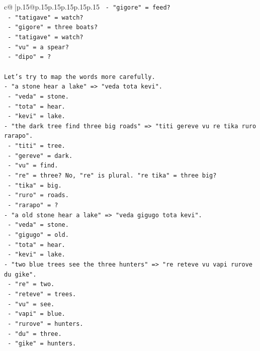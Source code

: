 \documentclass{article}
\begin{document}
{\begin{supertabular}{c@{$\;$}|p{.15\linewidth}@{}p{.15\linewidth}p{.15\linewidth}p{.15\linewidth}p{.15\linewidth}p{.15\linewidth}}
{{{\texttt{  {-} "gigore" = feed?} \\
\texttt{  {-} "tatigave" = watch?} \\
\texttt{  {-} "gigore" = three boats?} \\
\texttt{  {-} "tatigave" = watch?} \\
\texttt{  {-} "vu" = a spear?} \\
\texttt{  {-} "dipo" = ?} \\
\\ 
\texttt{Let's try to map the words more carefully.} \\
\texttt{{-} "a stone hear a lake" => "veda tota kevi".} \\
\texttt{  {-} "veda" = stone.} \\
\texttt{  {-} "tota" = hear.} \\
\texttt{  {-} "kevi" = lake.} \\
\texttt{{-} "the dark tree find three big roads" => "titi gereve vu re tika ruro rarapo".} \\
\texttt{  {-} "titi" = tree.} \\
\texttt{  {-} "gereve" = dark.} \\
\texttt{  {-} "vu" = find.} \\
\texttt{  {-} "re" = three? No, "re" is plural. "re tika" = three big?} \\
\texttt{  {-} "tika" = big.} \\
\texttt{  {-} "ruro" = roads.} \\
\texttt{  {-} "rarapo" = ?} \\
\texttt{{-} "a old stone hear a lake" => "veda gigugo tota kevi".} \\
\texttt{  {-} "veda" = stone.} \\
\texttt{  {-} "gigugo" = old.} \\
\texttt{  {-} "tota" = hear.} \\
\texttt{  {-} "kevi" = lake.} \\
\texttt{{-} "two blue trees see the three hunters" => "re reteve vu vapi rurove du gike".} \\
\texttt{  {-} "re" = two.} \\
\texttt{  {-} "reteve" = trees.} \\
\texttt{  {-} "vu" = see.} \\
\texttt{  {-} "vapi" = blue.} \\
\texttt{  {-} "rurove" = hunters.} \\
\texttt{  {-} "du" = three.} \\
\texttt{  {-} "gike" = hunters.} \\
}}}
\end{supertabular}}
\end{document}
